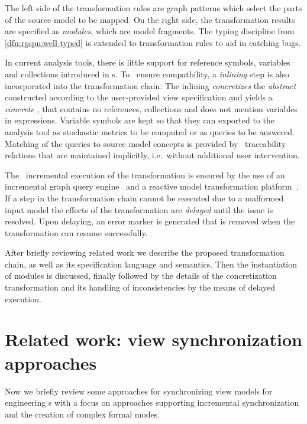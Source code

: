 The left side of the transformation rules are graph patterns which select the parts of the source model to be mapped. On the right side, the transformation results are specified as \emph{ modules}, which are  model fragments. The typing discipline from \vref{dfn:rgspn:well-typed} is extended to transformation rules to aid in catching bugs.

In current analysis tools, there is little support for reference symbols, variables and collections introduced in s. To ~ensure compatbility, a \emph{inlining} step is also incorporated into the transformation chain. The inlining \emph{concretizes} the \emph{abstract}  constructed according to the user-provided view specification and yields a \emph{concrete} , that contains no references, collections and does not mention variables in expressions. Variable symbols are kept so that they can exported to the analysis tool as stochastic metrics to be computed or as queries to be answered. Matching of the queries to source model concepts is provided by ~traceability relations that are maintained implicitly, i.e.~without additional user intervention.

The ~incremental execution of the transformation is ensured by the use of an incremental graph query engine~\citep{Ujhelyi15incquery} and a reactive model transformation platform~\citep{Bergmann15viatra}. If a step in the transformation chain cannot be executed due to a malformed input model the effects of the transformation are \emph{delayed} until the issue is resolved. Upon delaying, an error marker is generated that is removed when the transformation can resume successfully.

After briefly reviewing related work we describe the proposed transformation chain, as well as its specification language and semantics. Then the instantiation of  modules is discussed, finally followed by the details of the concretization transformation and its handling of inconsistencies by the means of delayed execution.

\section{Related work: view synchronization approaches}
\label{chap:transform:relwork}

Now we briefly review some approaches for synchronizing view models for engineering s with a focus on approaches supporting incremental synchronization and the creation of complex formal modes.

